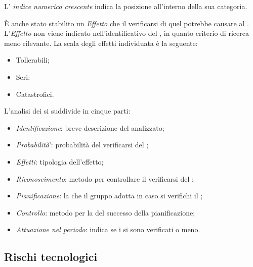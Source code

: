 L' \textit{indice numerico crescente} indica la posizione all'interno della sua categoria. 

\`E anche stato stabilito un \textit{Effetto} che il verificarsi di quel  potrebbe causare al . L'\textit{Effetto} non viene indicato nell'identificativo del , in quanto criterio di ricerca meno rilevante. La scala degli effetti individuata è la seguente:
\begin{itemize}
\item Tollerabili;
\item Seri;
\item Catastrofici.
\end{itemize}

L'analisi dei  si suddivide in cinque parti:
\begin{itemize}
\item \textit{Identificazione}: breve descrizione del  analizzato;
\item \textit{Probabilit\`a}': probabilit\`a del verificarsi del ;
\item \textit{Effetti}: tipologia dell'effetto;
\item \textit{Riconoscimento}: metodo per controllare il verificarsi del ;
\item \textit{Pianificazione}: la  che il gruppo adotta in caso si verifichi il ;
\item \textit{Controllo}: metodo per la  del successo della pianificazione;
\item \textit{Attuazione nel periodo}: indica se i  si sono verificati o meno.
\end{itemize}

\subsection{Rischi tecnologici}
